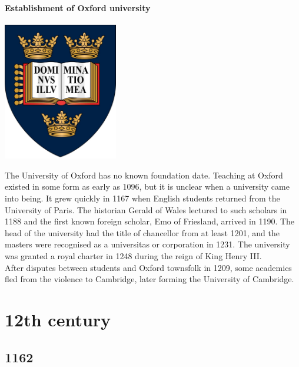 \documentclass[11pt]{report}
\begin{document}
\subsection{Establishment of Oxford university}
\vspace{2mm}\begin{center}\includegraphics[width=5cm]{./img/oxfordLogo.jpg}\end{center}
The University of Oxford has no known foundation date. Teaching at Oxford existed in some form as early as 1096, but it is unclear when a university came into being. It grew quickly in 1167 when English students returned from the University of Paris. The historian Gerald of Wales lectured to such scholars in 1188 and the first known foreign scholar, Emo of Friesland, arrived in 1190. The head of the university had the title of chancellor from at least 1201, and the masters were recognised as a universitas or corporation in 1231. The university was granted a royal charter in 1248 during the reign of King Henry III.\\
After disputes between students and Oxford townsfolk in 1209, some academics fled from the violence to Cambridge, later forming the University of Cambridge.

					
\part{12th century}
\chapter{1162}
\section{}
\end{document}
